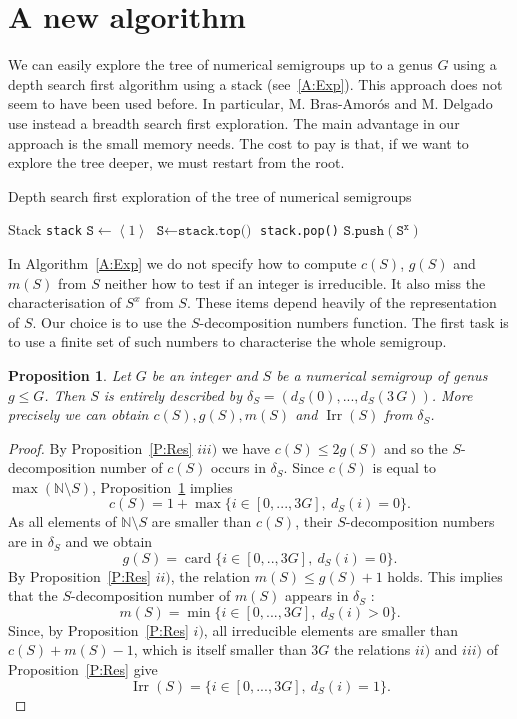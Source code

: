 \documentclass[reqno,11pt]{amsart}
\theoremstyle{plain}
\newtheorem{prop}{Proposition}[section]
\theoremstyle{definition}
\renewcommand{\leq}{\leqslant}
\newcommand{\NN}{\mathbb{N}}
\renewcommand{\tt}[1]{\texttt{#1}}
\DeclareMathOperator{\Irr}{Irr}
\DeclareMathOperator{\card}{card}
\begin{document}
\section{A new algorithm}
\label{S:Algo}
We can easily explore the tree of numerical semigroups up to a genus $G$ using a depth search first algorithm using a stack (see~\ref{A:Exp}). 
This approach does not seem to have been used before. 
In particular,  M. Bras-Amor\'os and M. Delgado use instead a breadth search first exploration. 
The main advantage in our approach is the small memory needs. 
The cost to pay is that, if we want to explore the tree deeper, we must restart from the root.

\begin{algorithm}
\caption{Depth search first exploration of the tree of numerical semigroups}\label{A:Exp}
\begin{algorithmic}[1]
\Procedure{Explore}{\tt{G}}
\State Stack \tt{stack} 
\State $\tt{S} \gets\left<1\right>$
	\State $\tt{S} \gets \tt{stack.top()}$
	\State \tt{stack.pop()}
	\If{$g(\tt{S})< \tt{G}$}
		\For{\tt{x} from $c(\tt{S})$ to $c(\tt{S})+m(\tt{S})$}
			\If{$\tt{x}\in \Irr(\tt{S})$}
				\State $\tt{S.push}(\tt{S}^\tt{x})$
			\EndIf
		\EndFor
	\EndIf
\EndWhile
\EndProcedure
\end{algorithmic}
\end{algorithm}

In Algorithm~\ref{A:Exp} we do not specify how to compute $c(S)$, $g(S)$ and $m(S)$  from $S$ neither how to test if an integer is irreducible. 
It also miss  the characterisation of $S^x$ from $S$.
These items depend heavily of the representation of $S$.
Our choice is to use the $S$-decomposition numbers function. 
The first task is to use a finite set of such numbers to characterise the whole semigroup.

\begin{prop}
\label{P:delta}
Let $G$ be an integer and $S$ be a numerical semigroup of genus $g\leq G$.
Then $S$ is entirely described by $\delta_S=(d_S(0),...,d_S(3\,G))$. More precisely we can obtain $c(S), g(S), m(S)$ and $\Irr(S)$ from $\delta_S$.
\end{prop} 

\begin{proof}
By Proposition~\ref{P:Res} $iii)$ we have $c(S)\leq 2g(S)$ and so the $S$-decomposition number of $c(S)$ occurs in $\delta_S$.
Since $c(S)$ is equal to $\max(\NN\setminus S)$, Proposition~\ref{P:delta} implies 
\[
c(S)=1+\max\{i\in[0,...,3G],\ d_S(i)=0\}.
\]
As all elements of $\NN\setminus S$ are smaller than $c(S)$, their $S$-decomposition numbers are in $\delta_S$ and we obtain
\[
g(S)=\card\{i\in[0,..,3G],\ d_S(i)=0\}.
\]
By Proposition~\ref{P:Res} $ii)$, the relation $m(S)\leq g(S)+1$ holds. 
This implies that the $S$-decomposition number of $m(S)$ appears in $\delta_S$ : 
\[
m(S)=\min\{i\in[0,...,3G],\ d_S(i)>0\}.
\]
Since, by Proposition~\ref{P:Res} $i)$,  all irreducible elements are smaller than $c(S)+m(S)-1$, which is itself smaller than $3G$ the relations $ii)$ and $iii)$ of Proposition~\ref{P:Res} give
\[
\Irr(S)=\{i\in[0,...,3G],\ d_S(i)=1\}.
\]
\end{proof}
\end{document}
